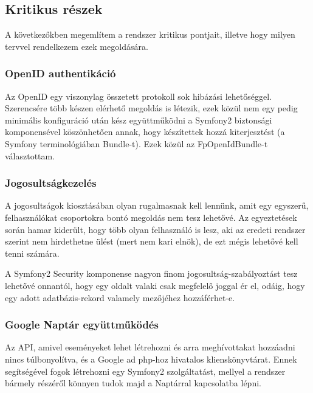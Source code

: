 \documentclass[a4paper,12pt,oneside]{report}
\begin{document}
\subsection{Kritikus részek}

A következőkben megemlítem a rendszer kritikus pontjait, illetve hogy milyen tervvel rendelkezem ezek megoldására.

\subsubsection{OpenID authentikáció}

Az OpenID\cite{website:openid_specifikacio} egy viszonylag összetett protokoll sok hibázási lehetőséggel. Szerencsére több készen elérhető megoldás is létezik, ezek közül nem egy pedig minimális konfiguráció után kész együttműködni a Symfony2 biztonsági komponensével köszönhetően annak, hogy készítettek hozzá kiterjesztést (a Symfony terminológiában Bundle-t). Ezek közül az FpOpenIdBundle\cite{website:fpopenidbundle}-t választottam.

\subsubsection{Jogosultságkezelés}

A jogosultságok kiosztásában olyan rugalmasnak kell lennünk, amit egy egyszerű, felhasználókat csoportokra bontó megoldás nem tesz lehetővé. Az egyeztetések során hamar kiderült, hogy több olyan felhasználó is lesz, aki az eredeti rendszer szerint nem hirdethetne ülést (mert nem kari elnök), de ezt mégis lehetővé kell tenni számára.

A Symfony2 Security komponense nagyon finom jogosultság-szabályoztást tesz lehetővé onnantól, hogy egy oldalt valaki csak megfelelő joggal ér el, odáig, hogy egy adott adatbázis-rekord valamely mezőjéhez hozzáférhet-e.

\subsubsection{Google Naptár együttműködés}

Az API, amivel eseményeket lehet létrehozni és arra meghívottakat hozzáadni\cite{website:gcal_event_api} nincs túlbonyolítva, és a Google ad php-hoz hivatalos klienskönyvtárat\cite{website:google_api_client}. Ennek segítségével fogok létrehozni egy Symfony2 szolgáltatást, mellyel a rendszer bármely részéről könnyen tudok majd a Naptárral kapcsolatba lépni.
\end{document}
